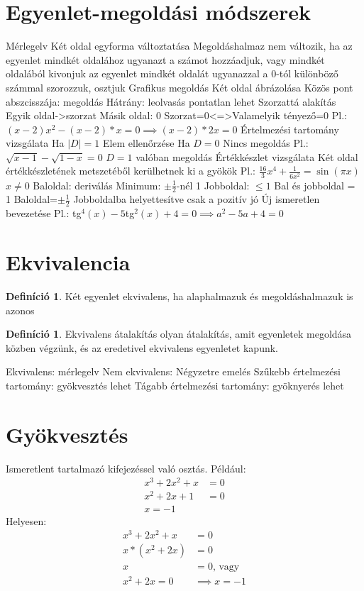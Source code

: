 \documentclass[twoside,12pt]{report}
\theoremstyle{definition}
\newtheorem{definition}[theorem]{Definíció}
\begin{document}
\section{Egyenlet-megoldási módszerek}
	\begin{outline}[enumerate]
		\1 Mérlegelv
			\2 Két oldal egyforma változtatása
			\2 Megoldáshalmaz nem változik, ha
				\3 az egyenlet mindkét oldalához ugyanazt a számot hozzáadjuk, vagy mindkét oldalából kivonjuk
				\3 az egyenlet mindkét oldalát ugyanazzal a 0-tól különböző számmal szorozzuk, osztjuk
		\1 Grafikus megoldás
			\2 Két oldal ábrázolása
			\2 Közös pont abszcisszája: megoldás
			\2 Hátrány: leolvasás pontatlan lehet
		\1 Szorzattá alakítás
			\2 Egyik oldal->szorzat
			\2 Másik oldal: 0
			\2 Szorzat=0<=>Valamelyik tényező=0
			\2 Pl.:$(x-2)x^2-(x-2)*x=0\implies(x-2)*2x=0$
		\1 Értelmezési tartomány vizsgálata
			\2 Ha $|D|=1$
				\3 Elem ellenőrzése
			\2 Ha $D=0$
				\3 Nincs megoldás
			\2 Pl.: $\sqrt{x-1}-\sqrt{1-x}=0$
				\3 $D={1}$
				 valóban megoldás
		\1 Értékkészlet vizsgálata
			\2 Két oldal értékkészletének metszetéből kerülhetnek ki a gyökök
			\2 Pl.:	$\frac{16}{3}x^4+\frac{1}{6x^2}=\sin(\pi x)$
				\3 $x\ne0$
				\3 Baloldal: deriválás
					\4 Minimum: $\pm\frac{1}{2}$-nél 1
				\3 Jobboldal: $\le1$
				\3 Bal és jobboldal = 1
				\3 Baloldal=$\pm\frac{1}{2}$
				\3 Jobboldalba helyettesítve csak a pozitív jó
		\1 Új ismeretlen bevezetése
			\2 Pl.: tg$^4(x)-5$tg$^2(x)+4=0\implies a^2-5a+4=0$
	\end{outline}
\section{Ekvivalencia}
	\begin{definition}
		Két egyenlet ekvivalens, ha alaphalmazuk és megoldáshalmazuk is azonos
	\end{definition}
	\begin{definition}
		Ekvivalens átalakítás olyan átalakítás, amit egyenletek megoldása közben végzünk, és az eredetivel ekvivalens egyenletet kapunk.
	\end{definition}
	\begin{outline}
		\1 Ekvivalens: mérlegelv
		\1 Nem ekvivalens: Négyzetre emelés
			\2 Szűkebb értelmezési tartomány: gyökvesztés lehet
			\2 Tágabb értelmezési tartomány: gyöknyerés lehet
	\end{outline}
\section{Gyökvesztés}
	Ismeretlent tartalmazó kifejezéssel való osztás. Például:
	\begin{align*}
		x^3+2x^2+x&=0\tag{Osztás nullával}\\
		x^2+2x+1&=0\\
		x=-1
	\end{align*}
	Helyesen:
	\begin{align*}
		x^3+2x^2+x&=0\\
		x*(x^2+2x)&=0\\
		x&=0\text{, vagy }\\
		x^2+2x=0&\implies x=-1
	\end{align*}
\end{document}
